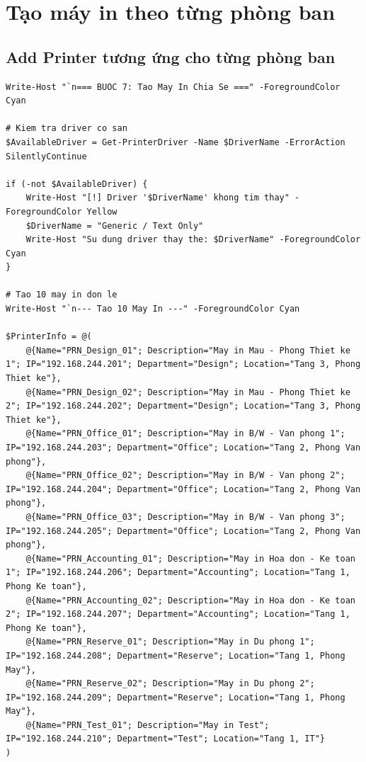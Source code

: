 \chapter{\textbf{Tạo máy in theo từng phòng ban}}
\section{Add Printer tương ứng cho từng phòng ban}

\begin{lstlisting}[style=powershell]
Write-Host "`n=== BUOC 7: Tao May In Chia Se ===" -ForegroundColor Cyan

# Kiem tra driver co san
$AvailableDriver = Get-PrinterDriver -Name $DriverName -ErrorAction SilentlyContinue

if (-not $AvailableDriver) {
    Write-Host "[!] Driver '$DriverName' khong tim thay" -ForegroundColor Yellow
    $DriverName = "Generic / Text Only"
    Write-Host "Su dung driver thay the: $DriverName" -ForegroundColor Cyan
}

# Tao 10 may in don le
Write-Host "`n--- Tao 10 May In ---" -ForegroundColor Cyan

$PrinterInfo = @(
    @{Name="PRN_Design_01"; Description="May in Mau - Phong Thiet ke 1"; IP="192.168.244.201"; Department="Design"; Location="Tang 3, Phong Thiet ke"},
    @{Name="PRN_Design_02"; Description="May in Mau - Phong Thiet ke 2"; IP="192.168.244.202"; Department="Design"; Location="Tang 3, Phong Thiet ke"},
    @{Name="PRN_Office_01"; Description="May in B/W - Van phong 1"; IP="192.168.244.203"; Department="Office"; Location="Tang 2, Phong Van phong"},
    @{Name="PRN_Office_02"; Description="May in B/W - Van phong 2"; IP="192.168.244.204"; Department="Office"; Location="Tang 2, Phong Van phong"},
    @{Name="PRN_Office_03"; Description="May in B/W - Van phong 3"; IP="192.168.244.205"; Department="Office"; Location="Tang 2, Phong Van phong"},
    @{Name="PRN_Accounting_01"; Description="May in Hoa don - Ke toan 1"; IP="192.168.244.206"; Department="Accounting"; Location="Tang 1, Phong Ke toan"},
    @{Name="PRN_Accounting_02"; Description="May in Hoa don - Ke toan 2"; IP="192.168.244.207"; Department="Accounting"; Location="Tang 1, Phong Ke toan"},
    @{Name="PRN_Reserve_01"; Description="May in Du phong 1"; IP="192.168.244.208"; Department="Reserve"; Location="Tang 1, Phong May"},
    @{Name="PRN_Reserve_02"; Description="May in Du phong 2"; IP="192.168.244.209"; Department="Reserve"; Location="Tang 1, Phong May"},
    @{Name="PRN_Test_01"; Description="May in Test"; IP="192.168.244.210"; Department="Test"; Location="Tang 1, IT"}
)


\end{lstlisting}

